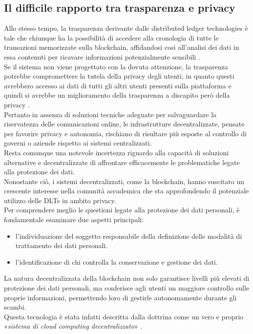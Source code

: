 \subsection{Il difficile rapporto tra trasparenza e privacy}
Allo stesso tempo, la trasparenza derivante dalle distributed ledger technologies è tale che chiunque ha la possibilità di accedere alla
cronologia di tutte le transazioni memorizzate sulla blockchain, affidandosi così all’analisi dei dati in essa contenuti per ricavare informazioni potenzialmente sensibili \cite{marr_history_blockchain_2018}.
\\Se il sistema non viene progettato con la dovuta attenzione, la trasparenza potrebbe compromettere la tutela della privacy degli utenti, in quanto questi avrebbero
accesso ai dati di tutti gli altri utenti presenti sulla piattaforma e quindi si avrebbe un miglioramento della trasparenza 
a discapito però della privacy \cite{zambardino_blockchain_2022} \cite{mayes_privacy_transparency_2018}.\\
Pertanto in assenza di soluzioni tecniche adeguate per salvaguardare la riservatezza delle comunicazioni online, le infrastrutture decentralizzate, pensate per favorire privacy e autonomia, 
rischiano di risultare più esposte al controllo di governi o aziende rispetto ai sistemi centralizzati.
\\Resta comunque una notevole incertezza riguardo alla capacità di soluzioni alternative e decentralizzate di affrontare efficacemente le problematiche legate alla protezione dei dati.
\\Nonostante ciò, i sistemi decentralizzati, come la blockchain, hanno suscitato un crescente interesse nella comunità accademica che sta approfondendo il potenziale utilizzo delle DLTs in ambito privacy.
\\Per comprendere meglio le questioni legate alla protezione dei dati personali, è fondamentale esaminare due aspetti principali:
\begin{itemize}
    \item l'individuazione del soggetto responsabile della definizione delle modalità di trattamento dei dati personali.
    \item l'identificazione di chi controlla la conservazione e gestione dei dati.
\end{itemize}
La natura decentralizzata della blockchain non solo garantisce livelli più elevati di protezione dei dati personali, ma conferisce agli utenti un maggiore controllo sulle proprie informazioni, permettendo loro di gestirle autonomamente durante gli scambi. \\Questa tecnologia è stata infatti descritta dalla dottrina come un vero e proprio «\textit{sistema di cloud computing decentralizzato}» \cite{bridge_blockchain_2018}.
